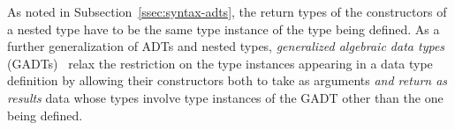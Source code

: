 \documentclass[acmsmall,screen,review,anonymous]{acmart}
\theoremstyle{definition}
\begin{document}

As noted in Subsection~\ref{ssec:syntax-adts},
the return types of the constructors of a nested
type have to be the same type instance of the type being defined.
As a further generalization of ADTs and nested types,
\emph{generalized algebraic data types} (GADTs)~\cite{ch03,xcc03,sp04}
relax the restriction on the type instances appearing in a data
type definition by allowing their constructors both to take as
arguments \emph{and return as results} data whose types involve type
instances of the GADT other than the one being defined.
\end{document}
